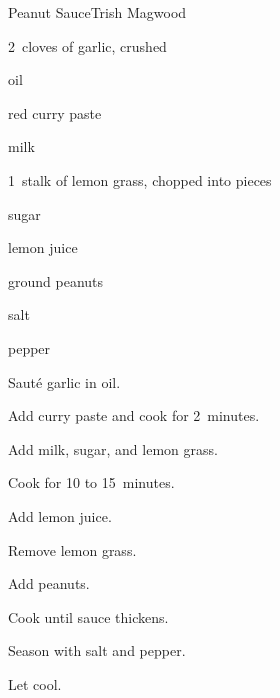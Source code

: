 \begin{recipe}{Peanut Sauce}{Trish Magwood}{}

\begin{ingredients}
\item 2~cloves of garlic, crushed
\item {} oil
\item {} red curry paste
\item {}  milk
\item 1~stalk of lemon grass, chopped into  pieces
\item \C{\quarter} sugar
\item \C{\quarter} lemon juice
\item {} ground peanuts
\item salt
\item pepper
\end{ingredients}

\begin{directions}
\item Sauté garlic in oil.
\item Add curry paste and cook for 2~minutes.
\item Add milk, sugar, and lemon grass.
\item Cook for 10 to 15~minutes.
\item Add lemon juice.
\item Remove lemon grass.
\item Add peanuts.
\item Cook until sauce thickens.
\item Season with salt and pepper.
\item Let cool.
\end{directions}

\end{recipe}
